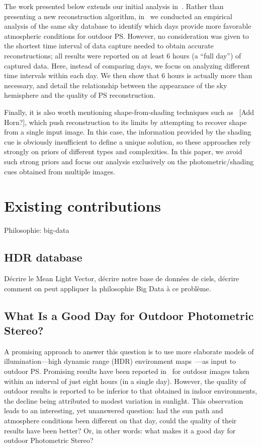 \documentclass{report}
\begin{document}
The work presented below extends our initial analysis in~\cite{holdgeoffroy-iccp-15}. Rather than presenting a new reconstruction algorithm, in~\cite{holdgeoffroy-iccp-15} we conducted an empirical analysis of the same sky database to identify which days provide more favorable atmospheric conditions for outdoor PS. However, no consideration was given to the shortest time interval of data capture needed to obtain accurate reconstructions; all results were reported on at least 6 hours (a ``full day'') of captured data. Here, instead of comparing days, we focus on analyzing different time intervals within each day. We then show that 6 hours is actually more than necessary, and detail the relationship between the appearance of the sky hemisphere and the quality of PS reconstruction.

Finally, it is also worth mentioning shape-from-shading techniques such as~\cite{oxholm-eccv-12,johnson-cvpr-11,barron-pami-15} [Add Horn?], which push reconstruction to its limits by attempting to recover shape from a single input image. In this case, the information provided by the shading cue is obviously insufficient to define a unique solution, so these approaches rely strongly on priors of different types and complexities. In this paper, we avoid such strong priors and focus our analysis exclusively on the photometric/shading cues obtained from multiple images. 




\chapter{Existing contributions}

Philosophie: big-data

\section{HDR database}

Décrire le Mean Light Vector, décrire notre base de données de ciels, décrire comment on peut appliquer la philosophie Big Data à ce problème.

\section{What Is a Good Day for Outdoor Photometric Stereo?}

A promising approach to answer this question is to use more elaborate models of illumination---high dynamic range (HDR) environment maps~\cite{reinhard-book-05}---as input to outdoor PS. Promising results have been reported in~\cite{yu-iccp-13} for outdoor images taken within an interval of just eight hours (in a single day). However, the quality of outdoor results is reported to be inferior to that obtained in indoor environments, the decline being attributed to modest variation in sunlight. This observation leads to an interesting, yet unanswered question: had the sun path and atmosphere conditions been different on that day, could the quality of their results have been better? Or, in other words: what makes it a good day for outdoor Photometric Stereo? 
\end{document}
